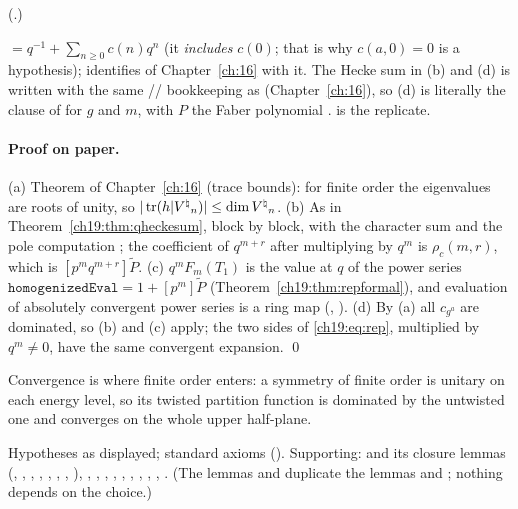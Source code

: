 (.)
\begin{dictionary}
 $=q^{-1}+\sum_{n\ge0}c(n)q^n$ (it \emph{includes} $c(0)$; that is why $c(a,0)=0$ is a hypothesis);
 identifies  of Chapter~\ref{ch:16} with it.  The Hecke sum in
(b) and (d) is written with the same // bookkeeping as
 (Chapter~\ref{ch:16}), so (d) is literally the clause of  for $g$ and $m$,
with $P$ the Faber polynomial .   is the replicate.
\end{dictionary}
\paragraph{Proof on paper.}  (a) Theorem of Chapter~\ref{ch:16} (trace bounds): for finite order the eigenvalues are roots of
unity, so $|\operatorname{tr}(h|{V^{\natural}}_n)|\le\dim{V^{\natural}}_n$.  (b) As in Theorem~\ref{ch19:thm:qheckesum}, block by block, with the character sum
 and the pole computation ; the coefficient of $q^{m+r}$ after multiplying by
$q^m$ is $\rho_c(m,r)$, which is $[p^mq^{m+r}]\tilde P$.  (c) $q^mF_m(T_1)$ is the value at $q$ of the power series
$\mathtt{homogenizedEval}=1+[p^m]\tilde P$ (Theorem~\ref{ch19:thm:repformal}), and evaluation of absolutely convergent power
series is a ring map (, ).  (d) By (a) all $c_{g^a}$ are dominated, so (b)
and (c) apply; the two sides of \eqref{ch19:eq:rep}, multiplied by $q^m\ne0$, have the same convergent expansion. \qed
\begin{physics}
Convergence is where finite order enters: a symmetry of finite order is unitary on each energy level, so its twisted
partition function is dominated by the untwisted one and converges on the whole upper half-plane.
\end{physics}
\begin{status}Hypotheses as displayed; standard axioms ().  Supporting:
 and its closure lemmas (, , , , ,
, , ), , , ,
, , , ,
, , .  (The lemmas
 and  duplicate the lemmas  and
; nothing depends on the choice.)\end{status}

